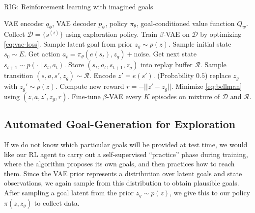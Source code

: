 \documentclass{article}
\begin{document}
\begin{algorithm}
   	\footnotesize
   	\caption{RIG: Reinforcement learning with imagined goals}
   	\label{alg:tbd}
   	\begin{multicols}{2}
   	\begin{algorithmic}[1]
    \REQUIRE VAE encoder $q_\phi$, VAE decoder $p_\psi$, policy $\pi_\theta$, goal-conditioned value function $Q_w$.
    \STATE Collect $\mathcal D = \{s^{(i)}\}$ using exploration policy.
    \STATE Train $\beta$-VAE on $\mathcal D$ by optimizing \eqref{eq:vae-loss}.
        \STATE Sample latent goal from prior $z_g \sim p(z)$.
        \STATE Sample initial state $s_0 \sim E$.
            \STATE Get action $a_t = \pi_\theta(e(s_t), z_g) + \text{noise}$.
            \STATE Get next state $s_{t+1} \sim p(\cdot \mid s_t, a_t)$.
            \STATE Store $(s_t, a_t, s_{t+1}, z_g)$ into replay buffer $\mathcal R$.
            \STATE Sample transition $(s, a, s', z_g) \sim \mathcal R$.
            \STATE Encode $z' = e(s')$.
            \STATE (Probability $0.5$) replace $z_g$ with $z_g' \sim p(z)$.
            \STATE Compute new reward $r = -||z' - z_g||$.
            \STATE Minimize \eqref{eq:bellman} using $(z, a, z', z_g, r)$.
        \ENDFOR
        \STATE Fine-tune $\beta$-VAE every $K$ episodes on mixture of $\mathcal D$ and $\mathcal R$.
    \ENDFOR
   	\end{algorithmic}
   	\end{multicols}
   	\vspace{-0.15in}
\end{algorithm}

\subsection{Automated Goal-Generation for Exploration}
If we do not know which particular goals will be provided at test time, we would like our RL agent to carry out a self-supervised ``practice'' phase during training, where the algorithm proposes its own goals, and then practices how to reach them.
Since the VAE prior represents a distribution over latent goals and state observations, we again sample from this distribution to obtain plausible goals.
After sampling a goal latent from the prior $z_g \sim p(z)$, we give this to our policy $\pi(z, z_g)$ to collect data.
\end{document}
